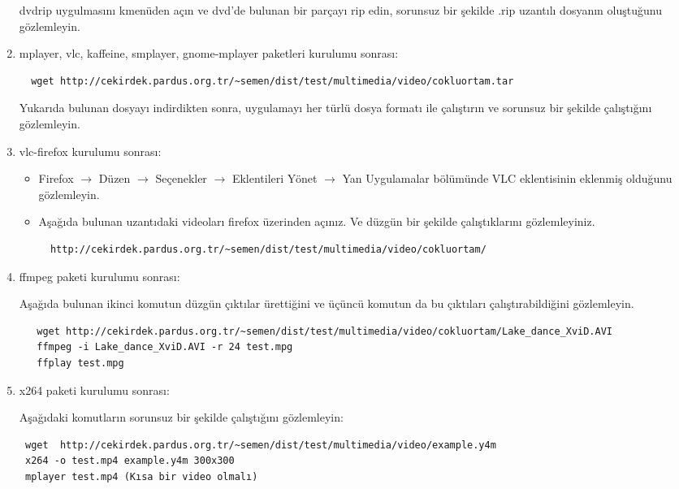 \documentclass[a4paper,10pt]{article}
\begin{document}
\begin{enumerate}
dvdrip uygulmasını kmenüden açın ve dvd'de bulunan bir parçayı rip edin, sorunsuz bir şekilde .rip uzantılı dosyanın oluştuğunu gözlemleyin.
 \item mplayer, vlc, kaffeine, smplayer, gnome-mplayer paketleri kurulumu sonrası:
 \begin{verbatim}
  wget http://cekirdek.pardus.org.tr/~semen/dist/test/multimedia/video/cokluortam.tar
 \end{verbatim}
Yukarıda bulunan dosyayı indirdikten sonra, uygulamayı her türlü dosya formatı ile çalıştırın ve sorunsuz bir şekilde çalıştığını gözlemleyin.
 \item vlc-firefox kurulumu sonrası:
 \begin{itemize}
  \item Firefox $\rightarrow$ Düzen $\rightarrow$ Seçenekler $\rightarrow$ Eklentileri Yönet $\rightarrow$ Yan Uygulamalar bölümünde VLC eklentisinin eklenmiş olduğunu gözlemleyin.
  \item Aşağıda bulunan uzantıdaki videoları firefox üzerinden açınız. Ve düzgün bir şekilde çalıştıklarını gözlemleyiniz.
  \begin{verbatim}
  http://cekirdek.pardus.org.tr/~semen/dist/test/multimedia/video/cokluortam/  
  \end{verbatim}
 \end{itemize}
\item ffmpeg paketi kurulumu sonrası:
 
Aşağıda bulunan ikinci komutun düzgün çıktılar ürettiğini ve üçüncü komutun da bu çıktıları çalıştırabildiğini gözlemleyin.
\begin{verbatim}
   wget http://cekirdek.pardus.org.tr/~semen/dist/test/multimedia/video/cokluortam/Lake_dance_XviD.AVI
   ffmpeg -i Lake_dance_XviD.AVI -r 24 test.mpg
   ffplay test.mpg
  \end{verbatim}
\item x264 paketi kurulumu sonrası:

Aşağıdaki komutların sorunsuz bir şekilde çalıştığını gözlemleyin:
\begin{verbatim}
 wget  http://cekirdek.pardus.org.tr/~semen/dist/test/multimedia/video/example.y4m
 x264 -o test.mp4 example.y4m 300x300 
 mplayer test.mp4 (Kısa bir video olmalı)
\end{verbatim}

\end{enumerate}
\end{document}

